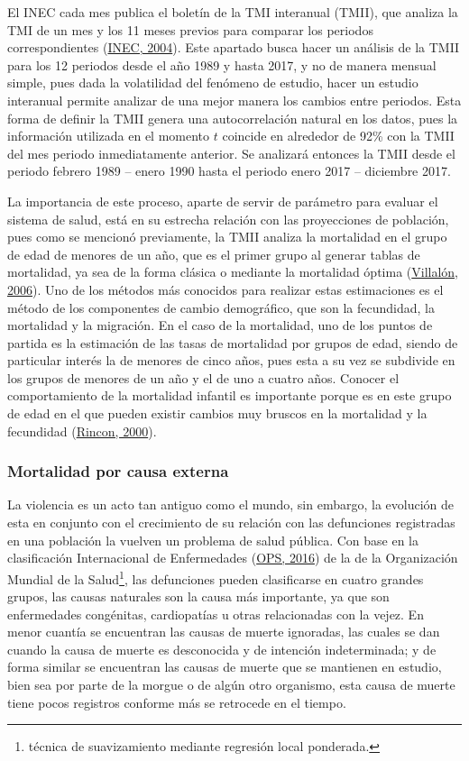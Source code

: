 \documentclass[
]{article}
\begin{document}
El INEC cada mes publica el boletín de la TMI interanual (TMII), que
analiza la TMI de un mes y los 11 meses previos para comparar los
periodos correspondientes (\protect\hyperlink{ref-infantiles}{INEC,
2004}). Este apartado busca hacer un análisis de la TMII para los 12
periodos desde el año 1989 y hasta 2017, y no de manera mensual simple,
pues dada la volatilidad del fenómeno de estudio, hacer un estudio
interanual permite analizar de una mejor manera los cambios entre
periodos. Esta forma de definir la TMII genera una autocorrelación
natural en los datos, pues la información utilizada en el momento \(t\)
coincide en alrededor de 92\% con la TMII del mes periodo inmediatamente
anterior. Se analizará entonces la TMII desde el periodo febrero 1989 --
enero 1990 hasta el periodo enero 2017 -- diciembre 2017.

La importancia de este proceso, aparte de servir de parámetro para
evaluar el sistema de salud, está en su estrecha relación con las
proyecciones de población, pues como se mencionó previamente, la TMII
analiza la mortalidad en el grupo de edad de menores de un año, que es
el primer grupo al generar tablas de mortalidad, ya sea de la forma
clásica o mediante la mortalidad óptima
(\protect\hyperlink{ref-mortalidad_optima}{Villalón, 2006}). Uno de los
métodos más conocidos para realizar estas estimaciones es el método de
los componentes de cambio demográfico, que son la fecundidad, la
mortalidad y la migración. En el caso de la mortalidad, uno de los
puntos de partida es la estimación de las tasas de mortalidad por grupos
de edad, siendo de particular interés la de menores de cinco años, pues
esta a su vez se subdivide en los grupos de menores de un año y el de
uno a cuatro años. Conocer el comportamiento de la mortalidad infantil
es importante porque es en este grupo de edad en el que pueden existir
cambios muy bruscos en la mortalidad y la fecundidad
(\protect\hyperlink{ref-Rincon}{Rincon, 2000}).

\subsubsection{Mortalidad por causa externa}

La violencia es un acto tan antiguo como el mundo, sin embargo, la
evolución de esta en conjunto con el crecimiento de su relación con las
defunciones registradas en una población la vuelven un problema de salud
pública. Con base en la clasificación Internacional de Enfermedades
(\protect\hyperlink{ref-CIE10}{OPS, 2016}) de la de la Organización
Mundial de la Salud\footnote{técnica de suavizamiento mediante regresión
  local ponderada.}, las defunciones pueden clasificarse en cuatro
grandes grupos, las causas naturales son la causa más importante, ya que
son enfermedades congénitas, cardiopatías u otras relacionadas con la
vejez. En menor cuantía se encuentran las causas de muerte ignoradas,
las cuales se dan cuando la causa de muerte es desconocida y de
intención indeterminada; y de forma similar se encuentran las causas de
muerte que se mantienen en estudio, bien sea por parte de la morgue o de
algún otro organismo, esta causa de muerte tiene pocos registros
conforme más se retrocede en el tiempo.
\end{document}
